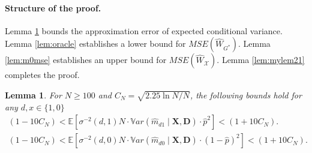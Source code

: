 \documentclass[12pt]{article}
\numberwithin{equation}{section}
\theoremstyle{plain}                         %
\newtheorem{lemma}{Lemma}
\theoremstyle{definition}                  %
\theoremstyle{remark}                      %
\newcommand{\E}{\mathbb{E}}
\newcommand{\Var}{\mathbb{V}ar}
\begin{document}
\paragraph{Structure of the proof.}   Lemma \ref{lem:bias} bounds the approximation error of expected conditional variance. Lemma \ref{lem:oracle} establishes a lower bound for $MSE (\widehat W_{G^{*}})$. Lemma \ref{lem:m0mse} establishes an upper bound for $MSE (\widehat{W}_{\mathcal{X}})$.  Lemma \ref{lem:mylem21}  completes the proof.


 \begin{lemma}
   \label{lem:bias}
 For $N \geq 100$ and $C_N = \sqrt{2.25 \ln N/N}$, the following bounds hold for any $d,x \in \{1,0\}$
\begin{align}
 (1-10 C_N) < \E [\sigma^{-2}(d,1)  N \cdot \Var ( \widehat m_{d1} \mid \mathbf{X}, \mathbf{D})\cdot    \widehat{p}^2] <  (1+ 10 C_N). \label{eq:varbound} \\
(1-10 C_N) <   \E [\sigma^{-2}(d,0) N \cdot \Var ( \widehat m_{d0} \mid \mathbf{X}, \mathbf{D})   \cdot (1-\widehat{p})^2] < (1+ 10 C_N). \label{eq:varbound2} 
\end{align}
\end{lemma}
\end{document}
